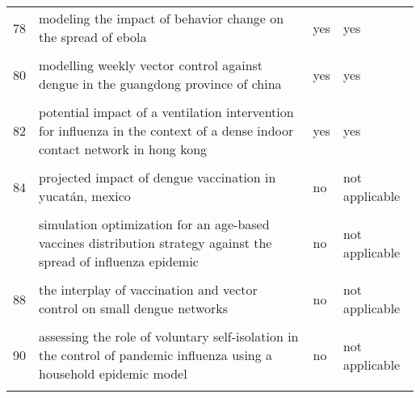 \documentclass[
]{article}
\begin{document}
\begin{landscape}
\begin{longtable}{l>{\raggedright\arraybackslash}p{9cm}ll}
78 & modeling the impact of behavior change on the spread of ebola & yes & yes\\
\cellcolor{gray!6}{79} & \cellcolor{gray!6}{modeling the spread of polio in an ipv-vaccinated population: lessons learned from the 2013 silent outbreak in southern israel} & \cellcolor{gray!6}{yes} & \cellcolor{gray!6}{yes}\\
80 & modelling weekly vector control against dengue in the guangdong province of china & yes & yes\\
\addlinespace
\cellcolor{gray!6}{81} & \cellcolor{gray!6}{optimal control strategies for the spread of ebola in west africa} & \cellcolor{gray!6}{no} & \cellcolor{gray!6}{not applicable}\\
82 & potential impact of a ventilation intervention for influenza in the context of a dense indoor contact network in hong kong & yes & yes\\
\cellcolor{gray!6}{83} & \cellcolor{gray!6}{predicting and evaluating the epidemic trend of ebola virus disease in the 2014-2015 outbreak and the effects of intervention measures} & \cellcolor{gray!6}{yes} & \cellcolor{gray!6}{yes}\\
84 & projected impact of dengue vaccination in yucatán, mexico & no & not applicable\\
\cellcolor{gray!6}{85} & \cellcolor{gray!6}{seasonality and the effectiveness of mass vaccination} & \cellcolor{gray!6}{no} & \cellcolor{gray!6}{not applicable}\\
\addlinespace
86 & simulation optimization for an age-based vaccines distribution strategy against the spread of influenza epidemic & no & not applicable\\
\cellcolor{gray!6}{87} & \cellcolor{gray!6}{spatiotemporal dynamics of the ebola epidemic in guinea and implications for vaccination and disease elimination: a computational modeling analysis} & \cellcolor{gray!6}{yes} & \cellcolor{gray!6}{yes}\\
88 & the interplay of vaccination and vector control on small dengue networks & no & not applicable\\
\cellcolor{gray!6}{89} & \cellcolor{gray!6}{an epidemic patchy model with entry–exit screening} & \cellcolor{gray!6}{no} & \cellcolor{gray!6}{not applicable}\\
90 & assessing the role of voluntary self-isolation in the control of pandemic influenza using a household epidemic model & no & not applicable\\
\addlinespace
\cellcolor{gray!6}{91} & \cellcolor{gray!6}{be-codis: a mathematical model to predict the risk of human diseases spread between countries—validation and application to the 2014–2015 ebola virus disease epidemic} & \cellcolor{gray!6}{yes} & \cellcolor{gray!6}{yes}\\

\end{longtable}
\end{landscape}
\end{document}
